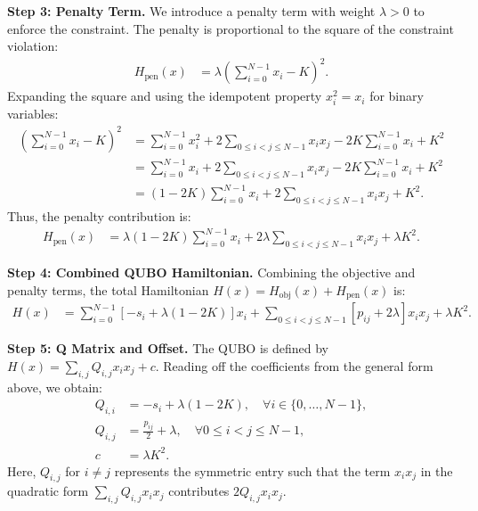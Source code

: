 \documentclass[12pt]{article}
\begin{document}
\textbf{Step 3: Penalty Term.}
We introduce a penalty term with weight $\lambda > 0$ to enforce the constraint. The penalty is proportional to the square of the constraint violation:
\begin{align}
    H_{\text{pen}}(x) &= \lambda \left( \sum_{i=0}^{N-1} x_i - K \right)^2.
\end{align}
Expanding the square and using the idempotent property $x_i^2 = x_i$ for binary variables:
\begin{align}
    \left( \sum_{i=0}^{N-1} x_i - K \right)^2 &= \sum_{i=0}^{N-1} x_i^2 + 2 \sum_{0 \le i < j \le N-1} x_i x_j - 2K \sum_{i=0}^{N-1} x_i + K^2 \nonumber \\
    &= \sum_{i=0}^{N-1} x_i + 2 \sum_{0 \le i < j \le N-1} x_i x_j - 2K \sum_{i=0}^{N-1} x_i + K^2 \nonumber \\
    &= (1 - 2K) \sum_{i=0}^{N-1} x_i + 2 \sum_{0 \le i < j \le N-1} x_i x_j + K^2.
\end{align}
Thus, the penalty contribution is:
\begin{align}
    H_{\text{pen}}(x) &= \lambda (1 - 2K) \sum_{i=0}^{N-1} x_i + 2\lambda \sum_{0 \le i < j \le N-1} x_i x_j + \lambda K^2.
\end{align}

\textbf{Step 4: Combined QUBO Hamiltonian.}
Combining the objective and penalty terms, the total Hamiltonian $H(x) = H_{\text{obj}}(x) + H_{\text{pen}}(x)$ is:
\begin{align}
    H(x) &= \sum_{i=0}^{N-1} \left[ -s_i + \lambda(1 - 2K) \right] x_i + \sum_{0 \le i < j \le N-1} \left[ p_{ij} + 2\lambda \right] x_i x_j + \lambda K^2.
\end{align}

\textbf{Step 5: Q Matrix and Offset.}
The QUBO is defined by $H(x) = \sum_{i,j} Q_{i,j} x_i x_j + c$. Reading off the coefficients from the general form above, we obtain:
\begin{align}
    Q_{i,i} &= -s_i + \lambda(1 - 2K), \quad \forall i \in \{0, \dots, N-1\}, \\
    Q_{i,j} &= \frac{p_{ij}}{2} + \lambda, \quad \forall 0 \le i < j \le N-1, \\
    c &= \lambda K^2.
\end{align}
Here, $Q_{i,j}$ for $i \neq j$ represents the symmetric entry such that the term $x_i x_j$ in the quadratic form $\sum_{i,j} Q_{i,j} x_i x_j$ contributes $2 Q_{i,j} x_i x_j$.
\end{document}
